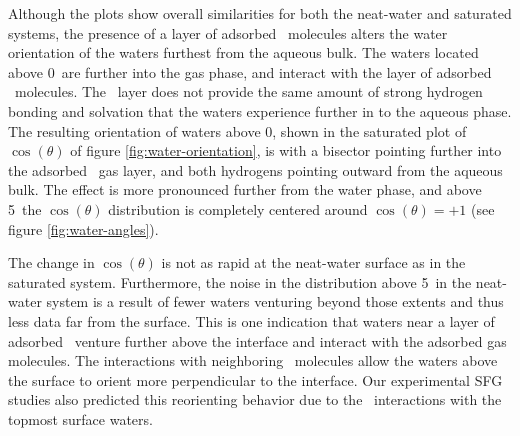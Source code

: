 Although the plots show overall similarities for both the neat-water and saturated systems, the presence of a layer of adsorbed \suldiox~molecules alters the water orientation of the waters furthest from the aqueous bulk. The waters located above 0\angs~are further into the gas phase, and interact with the layer of adsorbed \suldiox~molecules. The \suldiox~layer does not provide the same amount of strong hydrogen bonding and solvation that the waters experience further in to the aqueous phase. The resulting orientation of waters above 0\angs, shown in the saturated plot of $\cos(\theta)$ of figure \ref{fig:water-orientation}, is with a bisector pointing further into the adsorbed \suldiox~gas layer, and both hydrogens pointing outward from the aqueous bulk. The effect is more pronounced further from the water phase, and above 5\angs~the $\cos(\theta)$ distribution is completely centered around $\cos(\theta)=+1$ (see figure \ref{fig:water-angles}).


The change in $\cos(\theta)$ is not as rapid at the neat-water surface as in the saturated system. Furthermore, the noise in the distribution above 5\angs~in the neat-water system is a result of fewer waters venturing beyond those extents and thus less data far from the surface. This is one indication that waters near a layer of adsorbed \suldiox~venture further above the interface and interact with the adsorbed gas molecules. The interactions with neighboring \suldiox~molecules allow the waters above the surface to orient more perpendicular to the interface. Our experimental SFG studies also predicted this reorienting behavior due to the \suldiox~interactions with the topmost surface waters.\cite{Ota2011}

